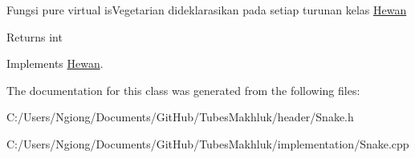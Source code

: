 Fungsi pure virtual is\+Vegetarian dideklarasikan pada setiap turunan kelas \hyperlink{class_hewan}{Hewan} \begin{DoxyReturn}{Returns}
int 
\end{DoxyReturn}


Implements \hyperlink{class_hewan_a90a316426af1d53add7ebf2a23ea9af2}{Hewan}.



The documentation for this class was generated from the following files\+:\begin{DoxyCompactItemize}
\item 
C\+:/\+Users/\+Ngiong/\+Documents/\+Git\+Hub/\+Tubes\+Makhluk/header/Snake.\+h\item 
C\+:/\+Users/\+Ngiong/\+Documents/\+Git\+Hub/\+Tubes\+Makhluk/implementation/Snake.\+cpp\end{DoxyCompactItemize}

